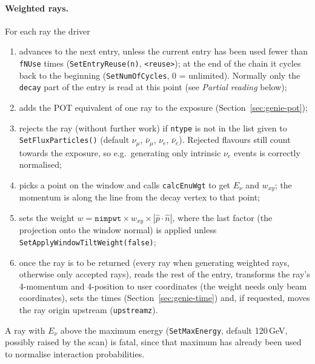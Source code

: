 \documentclass[11pt]{article}
\newcommand{\code}[1]{\texttt{#1}}
\newcommand{\numu}{\ensuremath{\nu_{\mu}}\xspace}
\newcommand{\numubar}{\ensuremath{\bar{\nu}_{\mu}}\xspace}
\newcommand{\nue}{\ensuremath{\nu_{e}}\xspace}
\newcommand{\nuebar}{\ensuremath{\bar{\nu}_{e}}\xspace}
\newcommand{\sect}[1]{Section~\ref{sec:#1}}
\begin{document}
\paragraph{Weighted rays.}  For each ray the driver
\begin{enumerate}[nosep]
\item advances to the next entry, unless the current entry has been used
      fewer than \code{fNUse} times (\code{SetEntryReuse(n)},
      \code{<reuse>}); at the end of the chain it cycles back to the
      beginning (\code{SetNumOfCycles}, 0 = unlimited).  Normally only the
      \code{decay} part of the entry is read at this point
      (see \emph{Partial reading} below);
\item adds the POT equivalent of one ray to the exposure (\sect{genie-pot});
\item rejects the ray (without further work) if \code{ntype} is not in the
      list given to \code{SetFluxParticles()} (default
      \numu, \numubar, \nue, \nuebar).  Rejected flavours still count towards
      the exposure, so e.g.\ generating only intrinsic \nue events is
      correctly normalised;
\item picks a point on the window and calls \code{calcEnuWgt} to get
      $E_\nu$ and $w_{xy}$; the momentum is along the line from the decay
      vertex to that point;
\item sets the weight
      $w = \code{nimpwt}\times w_{xy}\times|\hat p\cdot\hat n|$,
      where the last factor (the projection onto the window normal) is
      applied unless \code{SetApplyWindowTiltWeight(false)};
\item once the ray is to be returned (every ray when generating weighted
      rays, otherwise only accepted rays), reads the rest of the entry,
      transforms the ray's 4-momentum and 4-position to user coordinates
      (the weight needs only beam coordinates), sets the times
      (\sect{genie-time}) and, if requested, moves the ray origin upstream
      (\code{upstreamz}).
\end{enumerate}
A ray with $E_\nu$ above the maximum energy (\code{SetMaxEnergy},
default 120\,GeV, possibly raised by the scan) is fatal, since that maximum
has already been used to normalise interaction probabilities.
\end{document}
